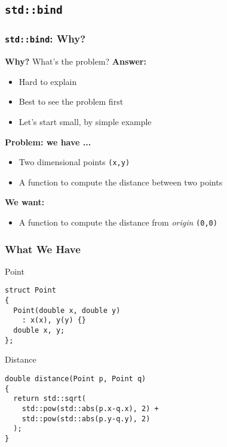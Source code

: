 \subsection{\texttt{std::bind}}

\begin{frame}
  \frametitle{\texttt{std::bind}: Why?}

  \textbf{Why?} What's the problem? \linebreak
  \textbf{Answer:} 

  \begin{itemize}
  \item Hard to explain
  \item Best to see the problem first
  \item Let's start small, by simple example
  \end{itemize}

  \textbf{Problem: we have ...}

  \begin{itemize}
  \item Two dimensional points \texttt{(x,y)}
  \item A function to compute the distance between two points
  \end{itemize}

  \textbf{We want:}

  \begin{itemize}
  \item A function to compute the distance from \textit{origin}
    \texttt{(0,0)}
  \end{itemize}

\end{frame}

\begin{frame}[fragile]
  \frametitle{What We Have}

  \begin{block}{Point}
\begin{verbatim}
struct Point
{
  Point(double x, double y)
    : x(x), y(y) {}
  double x, y;
};
\end{verbatim}
  \end{block}

  \begin{block}{Distance}
\begin{verbatim}
double distance(Point p, Point q)
{
  return std::sqrt(
    std::pow(std::abs(p.x-q.x), 2) + 
    std::pow(std::abs(p.y-q.y), 2)
  );
}
\end{verbatim}
  \end{block}

\end{frame}

